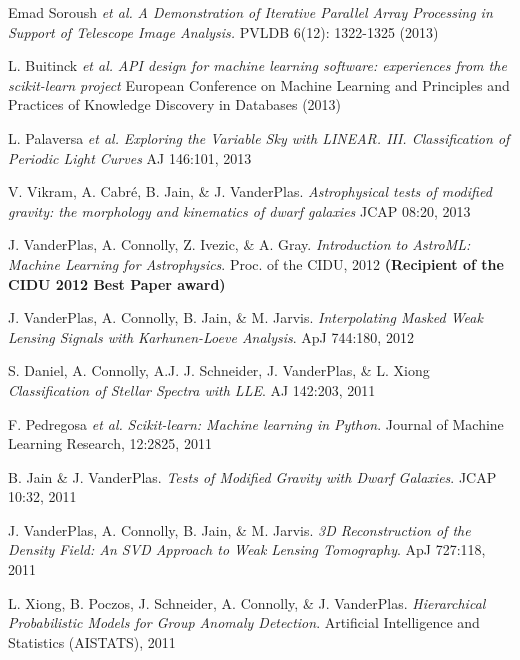 \documentclass{article} %
\def\bf{\bfseries}
\def\sl{\slshape}
\begin{document}
{\begin{itemize}[leftmargin=0ex, itemsep=0ex, parsep=.5ex, labelindent=-4ex]
    \publication
      Emad Soroush {\it et al.}
      {\it A Demonstration of Iterative Parallel Array Processing in Support
        of Telescope Image Analysis.}
      PVLDB 6(12): 1322-1325 (2013)

    \publication
      L. Buitinck {\it et al.}
      {\it API design for machine learning software:
        experiences from the scikit-learn project}
      European Conference on Machine Learning and Principles and Practices
      of Knowledge Discovery in Databases (2013)

    \publication
      L. Palaversa {\sl et al.}
      {\sl Exploring the Variable Sky with LINEAR. III.
        Classification of Periodic Light Curves}
      AJ 146:101, 2013

    \publication
      V. Vikram, A. Cabr\'{e}, B. Jain, \& J. VanderPlas.
      {\it Astrophysical tests of modified gravity:
        the morphology and kinematics of dwarf galaxies}
      JCAP 08:20, 2013
      
    \publication
      J. VanderPlas, A. Connolly, Z. Ivezic, \& A. Gray.
      {\sl Introduction to AstroML: Machine Learning for Astrophysics}.
      Proc. of the CIDU, 2012
      {\bf (Recipient of the CIDU 2012 Best Paper award)}

    \publication
      J. VanderPlas, A. Connolly, B. Jain, \& M. Jarvis.
      {\it Interpolating Masked Weak Lensing Signals with Karhunen-Loeve
        Analysis}.
      ApJ 744:180, 2012

    \publication
      S. Daniel, A. Connolly, A.J. J. Schneider, J. VanderPlas, \& L. Xiong
      {\sl Classification of Stellar Spectra with LLE}.
      AJ 142:203, 2011

    \publication
      F. Pedregosa {\sl et al.}
      {\sl Scikit-learn: Machine learning in Python}.
      Journal of Machine Learning Research, 12:2825, 2011

    \publication
      B. Jain \& J. VanderPlas.
      {\sl Tests of Modified Gravity with Dwarf Galaxies}.
      JCAP 10:32, 2011

    \publication
      J. VanderPlas, A. Connolly, B. Jain, \& M. Jarvis.
      {\sl 3D Reconstruction of the Density Field: An SVD Approach
        to Weak Lensing Tomography}.
      ApJ 727:118, 2011

    \publication
      L. Xiong, B. Poczos, J. Schneider, A. Connolly, \& J. VanderPlas.
      {\sl Hierarchical Probabilistic Models for Group Anomaly Detection}.
      Artificial Intelligence and Statistics (AISTATS), 2011



\end{itemize}}
\end{document}

